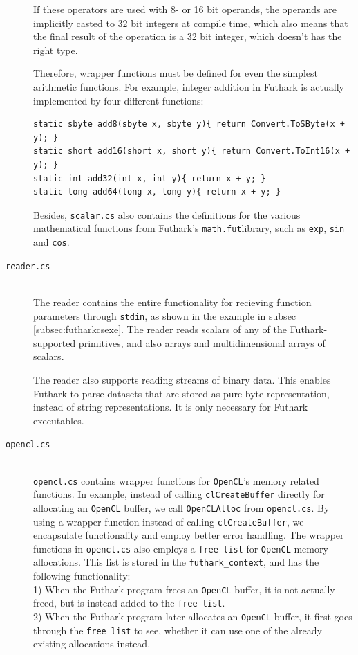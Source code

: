 \begin{description}
  If these operators are used with 8- or 16 bit operands, the operands are
  implicitly casted to 32 bit integers at compile time, which also means that
  the final result of the operation is a 32 bit integer, which doesn't has the
  right type.

  Therefore, wrapper functions must be defined for even the simplest arithmetic
  functions. For example, integer addition in \csharp{} Futhark is actually
    implemented by four different functions:
\begin{verbatim}
static sbyte add8(sbyte x, sbyte y){ return Convert.ToSByte(x + y); }
static short add16(short x, short y){ return Convert.ToInt16(x + y); }
static int add32(int x, int y){ return x + y; }
static long add64(long x, long y){ return x + y; }
\end{verbatim}

  Besides, \texttt{scalar.cs} also contains the \csharp{} definitions for the various
  mathematical functions from Futhark's \texttt{math.fut}library, such as \texttt{exp},
  \texttt{sin} and \texttt{cos}.


\item[\texttt{reader.cs}] \hfill\\
  The reader contains the entire functionality for recieving function parameters
  through \texttt{stdin}, as shown in the example in subsec
  \ref{subsec:futharkcsexe}.
  The reader reads scalars of any of the Futhark-supported primitives, and also arrays and multidimensional arrays of scalars.

  The reader also supports reading streams of binary data. This enables Futhark
  to parse datasets that are stored as pure byte representation, instead of
  string representations.
  It is only necessary for Futhark executables.
  

\item[\texttt{opencl.cs}] \hfill\\
  \texttt{opencl.cs} contains wrapper functions for \texttt{OpenCL}'s memory
  related functions. In example, instead of calling \texttt{clCreateBuffer} directly for
  allocating an \texttt{OpenCL} buffer, we call \texttt{OpenCLAlloc} from
  \texttt{opencl.cs}. By using a wrapper function instead of calling
  \texttt{clCreateBuffer}, we encapsulate functionality and employ better error
  handling.
  The wrapper functions in \texttt{opencl.cs} also employs a \texttt{free list} for \texttt{OpenCL}
  memory allocations. This list is stored in the \texttt{futhark\_context}, and
  has the following functionality:
  \\
  1) When the Futhark program frees an \texttt{OpenCL} buffer, it is not
  actually freed, but is instead added to the \texttt{free list}.\\
  2) When the Futhark program later allocates an \texttt{OpenCL} buffer, it
  first goes through the \texttt{free list} to see, whether it can use one of the already
  existing allocations instead.
\end{description}

